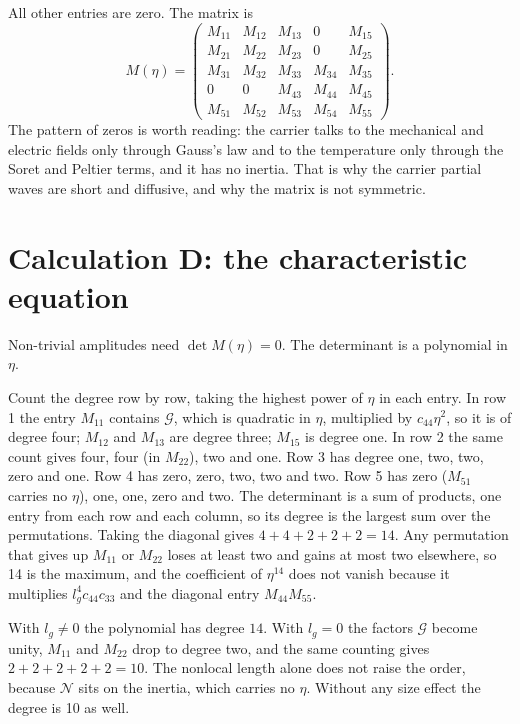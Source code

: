 \documentclass[11pt]{article}
\makeatletter
\newif\ifshowworked
\newenvironment{worked}{%
  \ifshowworked\par\smallskip\noindent\textit{Working.}\par\smallskip\else
  \setbox\z@\vbox\bgroup\fi}{\ifshowworked\par\smallskip\else\egroup\fi}
\newcommand{\Ncal}{\mathcal{N}}
\newcommand{\Gcal}{\mathcal{G}}
\makeatother
\begin{document}
All other entries are zero. The matrix is
\begin{equation}
M(\eta)=
\begin{pmatrix}
M_{11}&M_{12}&M_{13}&0&M_{15}\\
M_{21}&M_{22}&M_{23}&0&M_{25}\\
M_{31}&M_{32}&M_{33}&M_{34}&M_{35}\\
0&0&M_{43}&M_{44}&M_{45}\\
M_{51}&M_{52}&M_{53}&M_{54}&M_{55}
\end{pmatrix}.
\label{eq:Mmat}
\end{equation}
The pattern of zeros is worth reading: the carrier talks to the mechanical and electric fields only
through Gauss's law and to the temperature only through the Soret and Peltier terms, and it has no
inertia. That is why the carrier partial waves are short and diffusive, and why the matrix is not
symmetric.

\section{Calculation D: the characteristic equation}\label{sec:calcD}

Non-trivial amplitudes need $\det M(\eta)=0$. The determinant is a polynomial in $\eta$.

\begin{worked}
Count the degree row by row, taking the highest power of $\eta$ in each entry. In row 1 the entry
$M_{11}$ contains $\Gcal$, which is quadratic in $\eta$, multiplied by $c_{44}\eta^2$, so it is of degree
four; $M_{12}$ and $M_{13}$ are degree three; $M_{15}$ is degree one. In row 2 the same count gives four,
four (in $M_{22}$), two and one. Row 3 has degree one, two, two, zero and one. Row 4 has zero, zero, two,
two and two. Row 5 has zero ($M_{51}$ carries no $\eta$), one, one, zero and two.
The determinant is a sum of products, one entry from each row and each column, so its degree is the
largest sum over the permutations. Taking the diagonal gives $4+4+2+2+2=14$. Any permutation that gives
up $M_{11}$ or $M_{22}$ loses at least two and gains at most two elsewhere, so 14 is the maximum, and the
coefficient of $\eta^{14}$ does not vanish because it multiplies $l_g^4c_{44}c_{33}$ and the diagonal
entry $M_{44}M_{55}$.
\end{worked}

With $l_g\ne0$ the polynomial has degree $14$. With $l_g=0$ the factors $\Gcal$ become unity, $M_{11}$ and
$M_{22}$ drop to degree two, and the same counting gives $2+2+2+2+2=10$. The nonlocal length alone does not
raise the order, because $\Ncal$ sits on the inertia, which carries no $\eta$. Without any size effect the
degree is 10 as well.
\end{document}
